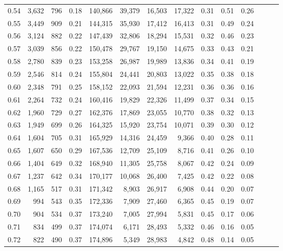 \begin{tabular}{rrrrrrrrrrrrrr}
0.54 &  3,632 &  796 &  0.18 &  140,866 &   39,379 &  16,503 &  17,322 &  0.31 &  0.51 &      0.26 \\
0.55 &  3,449 &  909 &  0.21 &  144,315 &   35,930 &  17,412 &  16,413 &  0.31 &  0.49 &      0.24 \\
0.56 &  3,124 &  882 &  0.22 &  147,439 &   32,806 &  18,294 &  15,531 &  0.32 &  0.46 &      0.23 \\
0.57 &  3,039 &  856 &  0.22 &  150,478 &   29,767 &  19,150 &  14,675 &  0.33 &  0.43 &      0.21 \\
0.58 &  2,780 &  839 &  0.23 &  153,258 &   26,987 &  19,989 &  13,836 &  0.34 &  0.41 &      0.19 \\
0.59 &  2,546 &  814 &  0.24 &  155,804 &   24,441 &  20,803 &  13,022 &  0.35 &  0.38 &      0.18 \\
0.60 &  2,348 &  791 &  0.25 &  158,152 &   22,093 &  21,594 &  12,231 &  0.36 &  0.36 &      0.16 \\
0.61 &  2,264 &  732 &  0.24 &  160,416 &   19,829 &  22,326 &  11,499 &  0.37 &  0.34 &      0.15 \\
0.62 &  1,960 &  729 &  0.27 &  162,376 &   17,869 &  23,055 &  10,770 &  0.38 &  0.32 &      0.13 \\
0.63 &  1,949 &  699 &  0.26 &  164,325 &   15,920 &  23,754 &  10,071 &  0.39 &  0.30 &      0.12 \\
0.64 &  1,604 &  705 &  0.31 &  165,929 &   14,316 &  24,459 &   9,366 &  0.40 &  0.28 &      0.11 \\
0.65 &  1,607 &  650 &  0.29 &  167,536 &   12,709 &  25,109 &   8,716 &  0.41 &  0.26 &      0.10 \\
0.66 &  1,404 &  649 &  0.32 &  168,940 &   11,305 &  25,758 &   8,067 &  0.42 &  0.24 &      0.09 \\
0.67 &  1,237 &  642 &  0.34 &  170,177 &   10,068 &  26,400 &   7,425 &  0.42 &  0.22 &      0.08 \\
0.68 &  1,165 &  517 &  0.31 &  171,342 &    8,903 &  26,917 &   6,908 &  0.44 &  0.20 &      0.07 \\
0.69 &    994 &  543 &  0.35 &  172,336 &    7,909 &  27,460 &   6,365 &  0.45 &  0.19 &      0.07 \\
0.70 &    904 &  534 &  0.37 &  173,240 &    7,005 &  27,994 &   5,831 &  0.45 &  0.17 &      0.06 \\
0.71 &    834 &  499 &  0.37 &  174,074 &    6,171 &  28,493 &   5,332 &  0.46 &  0.16 &      0.05 \\
0.72 &    822 &  490 &  0.37 &  174,896 &    5,349 &  28,983 &   4,842 &  0.48 &  0.14 &      0.05 \\

\end{tabular}
